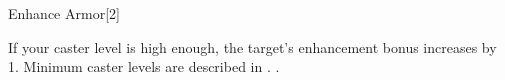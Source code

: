 \begin{spellsection}{Enhance Armor}[2]
    \begin{spellheader}
    \end{spellheader}
    \begin{spellcontent}
        \begin{spelltargetinginfo}
        \end{spelltargetinginfo}
        \begin{spelleffects}

            \spelleffect If your caster level is high enough, the target's enhancement bonus increases by 1. Minimum caster levels are described in .
            .
        \end{spelleffects}
    \end{spellcontent}
    \begin{spellfooter}
    \end{spellfooter}
\end{spellsection}


